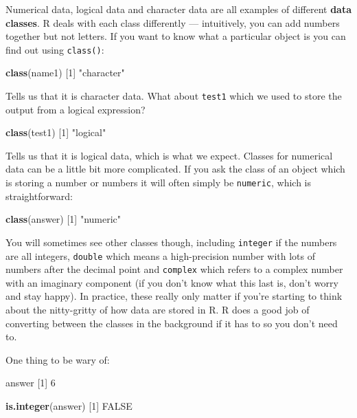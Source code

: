 \documentclass[
]{book}
\newenvironment{Shaded}{\begin{snugshade}}{\end{snugshade}}
\newcommand{\DecValTok}[1]{\textcolor[rgb]{0.00,0.00,0.81}{#1}}
\newcommand{\KeywordTok}[1]{\textcolor[rgb]{0.13,0.29,0.53}{\textbf{#1}}}
\newcommand{\NormalTok}[1]{#1}
\newcommand{\OtherTok}[1]{\textcolor[rgb]{0.56,0.35,0.01}{#1}}
\newcommand{\StringTok}[1]{\textcolor[rgb]{0.31,0.60,0.02}{#1}}
\begin{document}
Numerical data, logical data and character data are all examples of different \textbf{data classes}. R deals with each class differently --- intuitively, you can add numbers together but not letters. If you want to know what a particular object is you can find out using \texttt{class()}:

\begin{Shaded}
\begin{Highlighting}[]
\KeywordTok{class}\NormalTok{(name1)}
\NormalTok{[}\DecValTok{1}\NormalTok{] }\StringTok{"character"}
\end{Highlighting}
\end{Shaded}

Tells us that it is character data. What about \texttt{test1} which we used to store the output from a logical expression?

\begin{Shaded}
\begin{Highlighting}[]
\KeywordTok{class}\NormalTok{(test1)}
\NormalTok{[}\DecValTok{1}\NormalTok{] }\StringTok{"logical"}
\end{Highlighting}
\end{Shaded}

Tells us that it is logical data, which is what we expect. Classes for numerical data can be a little bit more complicated. If you ask the class of an object which is storing a number or numbers it will often simply be \texttt{numeric}, which is straightforward:

\begin{Shaded}
\begin{Highlighting}[]
\KeywordTok{class}\NormalTok{(answer)}
\NormalTok{[}\DecValTok{1}\NormalTok{] }\StringTok{"numeric"}
\end{Highlighting}
\end{Shaded}

You will sometimes see other classes though, including \texttt{integer} if the numbers are all integers, \texttt{double} which means a high-precision number with lots of numbers after the decimal point and \texttt{complex} which refers to a complex number with an imaginary component (if you don't know what this last is, don't worry and stay happy). In practice, these really only matter if you're starting to think about the nitty-gritty of how data are stored in R. R does a good job of converting between the classes in the background if it has to so you don't need to.

One thing to be wary of:

\begin{Shaded}
\begin{Highlighting}[]
\NormalTok{answer}
\NormalTok{[}\DecValTok{1}\NormalTok{] }\DecValTok{6}

\KeywordTok{is.integer}\NormalTok{(answer)}
\NormalTok{[}\DecValTok{1}\NormalTok{] }\OtherTok{FALSE}
\end{Highlighting}
\end{Shaded}
\end{document}
